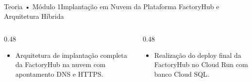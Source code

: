 \begin{senaiframe}{Teoria • Módulo 1}{Implantação em Nuvem da Plataforma FactoryHub e Arquitetura Híbrida}
  \begin{columns}[t]
    \begin{column}{0.48\textwidth}
      \begin{tcolorbox}[senaibluecard, title={Fundamentos Teóricos}]
        \begin{itemize}
          \item Arquitetura de implantação completa da FactoryHub na nuvem com apontamento DNS e HTTPS.
        \end{itemize}
      \end{tcolorbox}
    \end{column}
    \begin{column}{0.48\textwidth}
      \begin{tcolorbox}[senaigreencard, title={Prática \& Laboratório}]
        \begin{itemize}
          \item Realização do deploy final da FactoryHub no Cloud Run com banco Cloud SQL.
        \end{itemize}
      \end{tcolorbox}
    \end{column}
  \end{columns}
\end{senaiframe}
